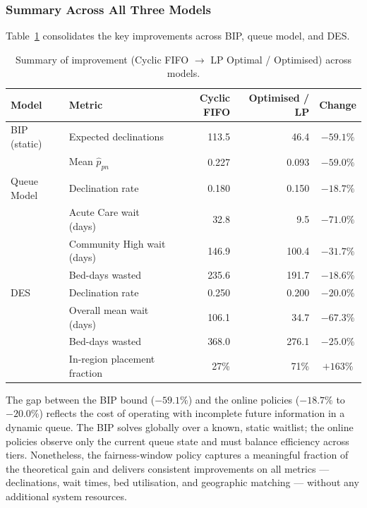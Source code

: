 \subsubsection{Summary Across All Three Models}
\label{sec:results_summary}

Table~\ref{tab:summary_all} consolidates the key improvements across BIP, queue model,
and DES.

\begin{table}[H]
\centering
\caption{Summary of improvement (Cyclic FIFO $\to$ LP Optimal / Optimised) across models.}
\label{tab:summary_all}
\begin{tabular}{llrrc}
\toprule
\textbf{Model} & \textbf{Metric} & \textbf{Cyclic FIFO} & \textbf{Optimised / LP} & \textbf{Change} \\
\midrule
BIP (static)   & Expected declinations        & 113.5 & 46.4  & $-59.1\%$ \\
               & Mean $\hat{p}_{pn}$          & 0.227 & 0.093 & $-59.0\%$ \\
\midrule
Queue Model    & Declination rate             & 0.180 & 0.150 & $-18.7\%$ \\
               & Acute Care wait (days)       & 32.8  & 9.5   & $-71.0\%$ \\
               & Community High wait (days)   & 146.9 & 100.4 & $-31.7\%$ \\
               & Bed-days wasted              & 235.6 & 191.7 & $-18.6\%$ \\
\midrule
DES            & Declination rate             & 0.250 & 0.200 & $-20.0\%$ \\
               & Overall mean wait (days)     & 106.1 & 34.7  & $-67.3\%$ \\
               & Bed-days wasted              & 368.0 & 276.1 & $-25.0\%$ \\
               & In-region placement fraction & 27\%  & 71\%  & $+163\%$ \\
\bottomrule
\end{tabular}
\end{table}

\noindent
The gap between the BIP bound ($-59.1\%$) and the online policies ($-18.7\%$ to
$-20.0\%$) reflects the cost of operating with incomplete future information in a
dynamic queue.  The BIP solves globally over a known, static waitlist; the online
policies observe only the current queue state and must balance efficiency across tiers.
Nonetheless, the fairness-window policy captures a meaningful fraction of the
theoretical gain and delivers consistent improvements on all metrics --- declinations,
wait times, bed utilisation, and geographic matching --- without any additional
system resources.
